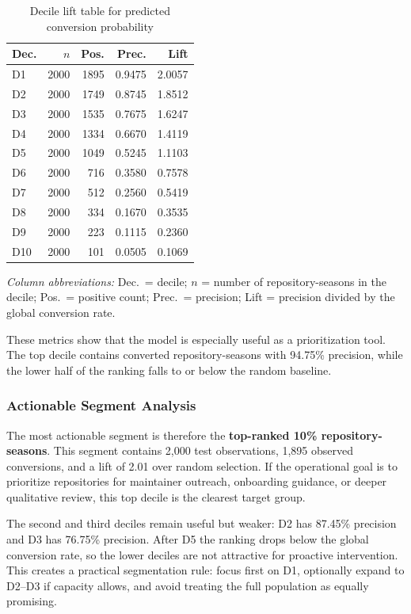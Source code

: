 \begin{table}[H]
\centering
\footnotesize
\setlength{\tabcolsep}{4pt}
\renewcommand{\arraystretch}{0.92}
\begin{tabular}{@{}lrrrr@{}}
\hline
Dec. & $n$ & Pos. & Prec. & Lift \\
\hline
D1 & 2000 & 1895 & 0.9475 & 2.0057 \\
D2 & 2000 & 1749 & 0.8745 & 1.8512 \\
D3 & 2000 & 1535 & 0.7675 & 1.6247 \\
D4 & 2000 & 1334 & 0.6670 & 1.4119 \\
D5 & 2000 & 1049 & 0.5245 & 1.1103 \\
D6 & 2000 & 716 & 0.3580 & 0.7578 \\
D7 & 2000 & 512 & 0.2560 & 0.5419 \\
D8 & 2000 & 334 & 0.1670 & 0.3535 \\
D9 & 2000 & 223 & 0.1115 & 0.2360 \\
D10 & 2000 & 101 & 0.0505 & 0.1069 \\
\hline
\end{tabular}
\caption{Decile lift table for predicted conversion probability}
\label{tab:modeling_decile_lift}
\end{table}

\noindent\footnotesize\emph{Column abbreviations:} Dec.\ = decile; $n$ = number of repository-seasons in the decile; Pos.\ = positive count; Prec.\ = precision; Lift = precision divided by the global conversion rate.\normalsize

These metrics show that the model is especially useful as a prioritization tool. The top decile contains converted repository-seasons with 94.75\% precision, while the lower half of the ranking falls to or below the random baseline.

\subsubsection{Actionable Segment Analysis}

The most actionable segment is therefore the \textbf{top-ranked 10\% repository-seasons}. This segment contains 2,000 test observations, 1,895 observed conversions, and a lift of 2.01 over random selection. If the operational goal is to prioritize repositories for maintainer outreach, onboarding guidance, or deeper qualitative review, this top decile is the clearest target group.

The second and third deciles remain useful but weaker: D2 has 87.45\% precision and D3 has 76.75\% precision. After D5 the ranking drops below the global conversion rate, so the lower deciles are not attractive for proactive intervention. This creates a practical segmentation rule: focus first on D1, optionally expand to D2--D3 if capacity allows, and avoid treating the full population as equally promising.

